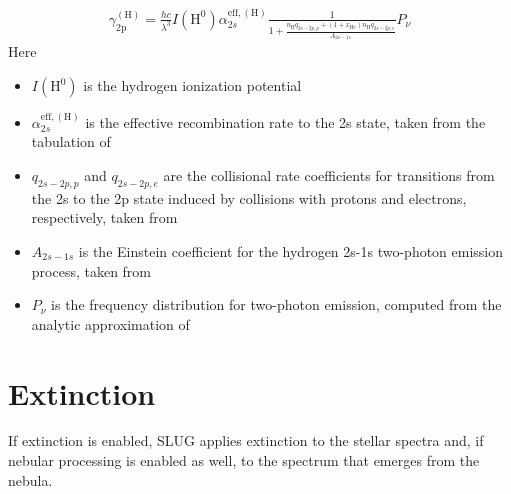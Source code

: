 \documentclass[letterpaper,10pt,english]{sphinxmanual}
\begin{document}
\begin{equation*}
\begin{split}\gamma_{\mathrm{2p}}^{(\mathrm{H})} = \frac{hc}{\lambda^3} I(\mathrm{H}^0) \alpha_{2s}^{\mathrm{eff,(H)}} \frac{1}{1 + \frac{n_{\mathrm{H}} q_{2s-2p,p} + (1+x_{\mathrm{He}}) n_{\mathrm{H}} q_{2s-2p,e}}{A_{2s-1s}}} P_\nu\end{split}
\end{equation*}
Here
\begin{itemize}
\item {} 
\(I(\mathrm{H}^0)\) is the hydrogen ionization potential

\item {} 
\(\alpha_{2s}^{\mathrm{eff,(H)}}\) is the effective recombination rate to the 2s state, taken from the tabulation of 

\item {} 
\(q_{2s-2p,p}\) and \(q_{2s-2p,e}\) are the collisional rate coefficients for transitions from the 2s to the 2p state induced by collisions with protons and electrons, respectively, taken from 

\item {} 
\(A_{2s-1s}\) is the Einstein coefficient for the hydrogen 2s-1s two-photon emission process, taken from 

\item {} 
\(P_\nu\) is the frequency distribution for two-photon emission, computed from the analytic approximation of 

\end{itemize}


\section{Extinction}
\label{\detokenize{intro:ssec-extinction}}\label{\detokenize{intro:extinction}}
If extinction is enabled, SLUG applies extinction to the stellar spectra and, if nebular processing is enabled as well, to the spectrum that emerges from the nebula.
\end{document}
